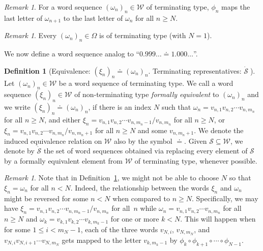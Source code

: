 \documentclass{amsart}
\theoremstyle{definition}
\newtheorem{definition}[theorem]{Definition}
\theoremstyle{remark}
\newtheorem{remark}[theorem]{Remark}
\numberwithin{equation}{section}
\begin{document}
 \begin{remark}\label{last}
 For a word sequence $(\omega_n)_n\in {\mathcal W}$ of terminating type, $\phi_n$ maps the last letter of $\omega_{n+1}$ to the last letter of $\omega_n$ for all $n\geqslant N$.
\end{remark}

\begin{remark} Every  $(\omega_n)_n\in \Omega$ is of terminating type (with $N=1$).
\end{remark}

We now define a word sequence analog to ``$0.999\ldots\doteq 1.000\ldots$''.

\begin{definition}[Equivalence: $(\xi_n)_n \doteq(\omega_n)_n$. Terminating representatives: $\dot {\mathcal S}\;$]\label{comp}
Let $(\omega_n)_n\in {\mathcal W}$ be a word sequence of terminating type.
We call a word sequence $(\xi_n)_n\in {\mathcal W}$ of non-terminating type {\em formally equivalent} to $(\omega_n)_n$ and we write $(\xi_n)_n \doteq(\omega_n)_n$, if there is an index $N$ such that $\omega_n=v_{n,1}v_{n,2}\cdots  v_{n,{m_n}}$ for all $n\geqslant N$, and
either $\xi_n=v_{n,1}v_{n,2}\cdots v_{n,{m_n-1}}/v_{n,{m_n}}$  for all $n\geqslant N$,
 or   $\xi_n=v_{n,1}v_{n,2}\cdots v_{n,{m_n}}/v_{n,{m_n}+1}$  for all $n\geqslant N$ and some $v_{n,{m_n}+1}$.
 We denote the induced equivalence relation on $\mathcal W$ also by the symbol $\doteq$.
 Given  $\mathcal S\subseteq \mathcal W$, we denote by $\dot {\mathcal S}$ the set of word sequences obtained via replacing every element of $\mathcal S$ by a formally equivalent element from $\mathcal W$ of terminating type, whenever possible.
\end{definition}

\begin{remark} Note that in Definition~\ref{comp}, we might not be able to choose $N$ so that $\xi_n=\omega_n$ for all $n<N$. Indeed, the relationship between the words $\xi_n$ and $\omega_n$ might be reversed for some $n<N$ when compared to $n\geqslant N$. Specifically, we may have $\xi_n=v_{n,1}v_{n,2}\cdots v_{n,{m_n-1}}/v_{n,{m_n}}$  for all~$n$ while $\omega_n=v_{n,1}v_{n,2}\cdots  v_{n,{m_n}}$ for all $n\geqslant N$ and
  $\omega_k=v_{k,1}v_{k,2}\cdots  v_{k,{m_k}-1}$ for one or more $k<N$. This will happen when for some $1\leqslant i< m_N-1$, each of the three words $v_{N,i}$, $v_{N,m_N}$, and $v_{N,i}v_{N,i+1}\cdots v_{N,m_N}$ gets mapped to the letter $v_{k,m_k-1}$ by $\phi_k\circ\phi_{k+1}\circ\cdots\circ\phi_{N-1}$.
\end{remark}
\end{document}
